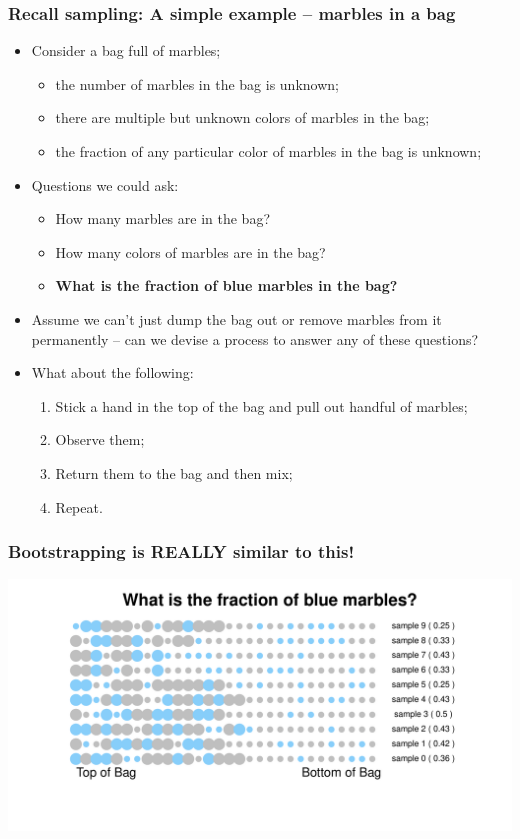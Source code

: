 \documentclass[aspectratio=169]{beamer}
\theoremstyle{principle}
\begin{document}
\begin{frame}
\frametitle{Recall sampling: A simple example -- marbles in a bag}

\begin{itemize}
\item Consider a bag full of marbles;
\begin{itemize}
\item the number of marbles in the bag is unknown;
\item there are multiple but unknown colors of marbles in the bag;
\item the fraction of any particular color of marbles in the bag is unknown;
\end{itemize}
\bigskip
\item Questions we could ask:
\begin{itemize}
\item How many marbles are in the bag?
\item How many colors of marbles are in the bag?
\item \textbf{What is the fraction of blue marbles in the bag?}
\end{itemize}
\bigskip
\item Assume we can't just dump the bag out or remove marbles from it permanently -- can we devise a process to answer any of these questions?
\bigskip
\item What about the following:
\begin{enumerate}
\item Stick a hand in the top of the bag and pull out handful of marbles;
\item Observe them;
\item Return them to the bag and then mix;
\item Repeat.
\end{enumerate} 
\end{itemize}

\end{frame}

\begin{frame}
\frametitle{\textbf{Bootstrapping} is REALLY similar to this!}
\begin{center}
\includegraphics[scale=0.57]{sample_full.pdf}
\end{center}
\end{frame}
\end{document}
